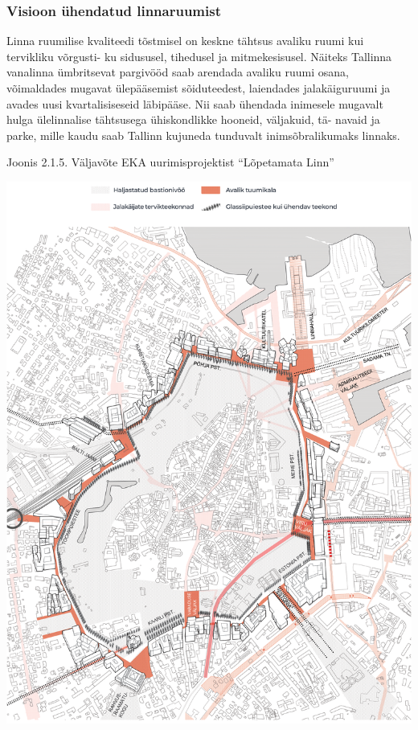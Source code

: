 \documentclass[estonian,]{article}
\begin{document}
\hypertarget{visioon-uxfchendatud-linnaruumist}{%
\subsubsection{Visioon ühendatud linnaruumist}\label{visioon-uxfchendatud-linnaruumist}}

Linna ruumilise kvaliteedi tõstmisel on keskne tähtsus avaliku ruumi kui tervikliku võrgusti- ku sidususel, tihedusel ja mitmekesisusel. Näiteks Tallinna vanalinna ümbritsevat pargivööd saab arendada avaliku ruumi osana, võimaldades mugavat ülepääsemist sõiduteedest, laiendades jalakäiguruumi ja avades uusi kvartalisiseseid läbipääse. Nii saab ühendada inimesele mugavalt hulga ülelinnalise tähtsusega ühiskondlikke hooneid, väljakuid, tä- navaid ja parke, mille kaudu saab Tallinn kujuneda tunduvalt inimsõbralikumaks linnaks.

{Joonis 2.1.5.} Väljavõte EKA uurimisprojektist ``Lõpetamata Linn''

\begin{center}\includegraphics[width=1\linewidth]{figures/2-chapter/fig215} \end{center}
\end{document}

